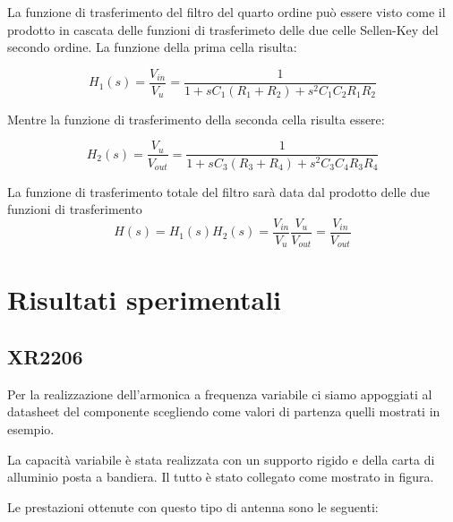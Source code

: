 \documentclass[titlepage]{report}
\begin{document}
	La funzione di trasferimento del filtro del quarto ordine può essere visto come il prodotto in cascata delle funzioni di trasferimeto delle due celle Sellen-Key del secondo ordine.
	La funzione della prima cella risulta:

	\begin{equation}
		H_1(s) = \frac{V_{in}}{V_u}  =  \frac{1}{1 + sC_1(R_1 + R_2)+ s^2C_1C_2R_1R_2 } 
	\end{equation}

	Mentre la funzione di trasferimento della seconda cella risulta essere:

	\begin{equation}
		H_2(s) = \frac{V_u}{V_{out}}  = \frac{1}{1 + sC_3(R_3 + R_4)+ s^2C_3C_4R_3R_4 } 
	\end{equation}

	La funzione di trasferimento totale del filtro sarà data dal prodotto delle due funzioni di trasferimento
	\begin{equation}
		H(s) = H_1(s)H_2(s) =  \frac{V_{in}}{V_u}\frac{V_u}{V_{out}} = \frac{V_{in}}{V_{out}}
	\end{equation}

	



\chapter{Risultati sperimentali}

\section{XR2206}
	Per la realizzazione dell'armonica a frequenza variabile ci siamo appoggiati al datasheet del componente scegliendo come valori di partenza quelli mostrati in esempio. 
	
	La capacità variabile è stata realizzata con un supporto rigido e della carta di alluminio posta a bandiera. Il tutto è stato collegato come mostrato in figura.
	
	
	Le prestazioni ottenute con questo tipo di antenna sono le seguenti:
	
\end{document}
